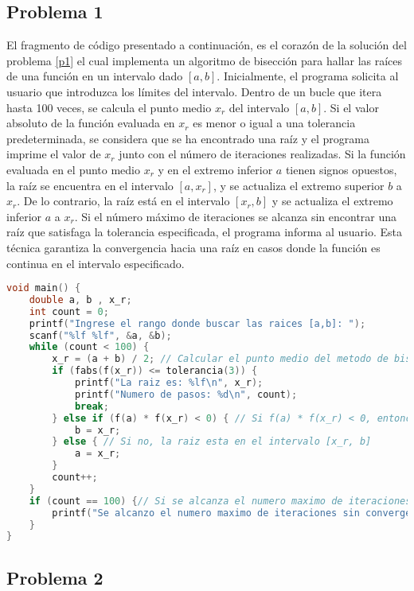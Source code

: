 \documentclass[12pt]{article}
\begin{document}
\subsection{Problema 1}

El fragmento de código presentado a continuación, es el corazón de la solución del problema \ref{p1} el cual implementa un algoritmo de bisección para hallar las raíces de una función en un intervalo dado \([a,b]\). Inicialmente, el programa solicita al usuario que introduzca los límites del intervalo. Dentro de un bucle que itera hasta 100 veces, se calcula el punto medio \(x_r\) del intervalo \([a,b]\). Si el valor absoluto de la función evaluada en \(x_r\) es menor o igual a una tolerancia predeterminada, se considera que se ha encontrado una raíz y el programa imprime el valor de \(x_r\) junto con el número de iteraciones realizadas. Si la función evaluada en el punto medio \(x_r\) y en el extremo inferior \(a\) tienen signos opuestos, la raíz se encuentra en el intervalo \([a, x_r]\), y se actualiza el extremo superior \(b\) a \(x_r\). De lo contrario, la raíz está en el intervalo \([x_r, b]\) y se actualiza el extremo inferior \(a\) a \(x_r\). Si el número máximo de iteraciones se alcanza sin encontrar una raíz que satisfaga la tolerancia especificada, el programa informa al usuario. Esta técnica garantiza la convergencia hacia una raíz en casos donde la función es continua en el intervalo especificado. 


\begin{lstlisting}[language=C, caption={Problema 1.}, style=mystyle]
void main() {
    double a, b , x_r;
    int count = 0;
    printf("Ingrese el rango donde buscar las raices [a,b]: ");
    scanf("%lf %lf", &a, &b);
    while (count < 100) {
        x_r = (a + b) / 2; // Calcular el punto medio del metodo de biseccion
        if (fabs(f(x_r)) <= tolerancia(3)) {
            printf("La raiz es: %lf\n", x_r);
            printf("Numero de pasos: %d\n", count);
            break;
        } else if (f(a) * f(x_r) < 0) { // Si f(a) * f(x_r) < 0, entonces la raiz esta en el intervalo [a, x_r]
            b = x_r;
        } else { // Si no, la raiz esta en el intervalo [x_r, b]
            a = x_r;
        }
        count++;
    }
    if (count == 100) {// Si se alcanza el numero maximo de iteraciones sin convergencia
        printf("Se alcanzo el numero maximo de iteraciones sin convergencia.\n");
    }
}
    \end{lstlisting}

\subsection{Problema 2} \label{sp2}
\end{document}
